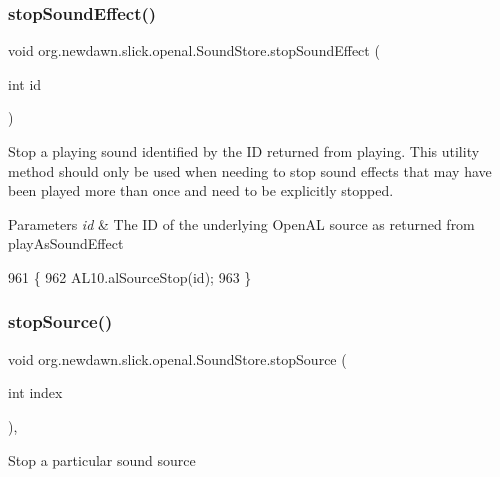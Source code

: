 \subsubsection{\texorpdfstring{stop\+Sound\+Effect()}{stopSoundEffect()}}
{\footnotesize\ttfamily void org.\+newdawn.\+slick.\+openal.\+Sound\+Store.\+stop\+Sound\+Effect (\begin{DoxyParamCaption}\item[{int}]{id }\end{DoxyParamCaption})\hspace{0.3cm}{\ttfamily [inline]}}

Stop a playing sound identified by the ID returned from playing. This utility method should only be used when needing to stop sound effects that may have been played more than once and need to be explicitly stopped.


\begin{DoxyParams}{Parameters}
{\em id} & The ID of the underlying Open\+AL source as returned from play\+As\+Sound\+Effect \\
\hline
\end{DoxyParams}

\begin{DoxyCode}
961                                         \{
962         AL10.alSourceStop(\textcolor{keywordtype}{id});
963     \}
\end{DoxyCode}
\mbox{\label{classorg_1_1newdawn_1_1slick_1_1openal_1_1_sound_store_abbc79b5bafc0b1e6108e028e8232f572}} 
\subsubsection{\texorpdfstring{stop\+Source()}{stopSource()}}
{\footnotesize\ttfamily void org.\+newdawn.\+slick.\+openal.\+Sound\+Store.\+stop\+Source (\begin{DoxyParamCaption}\item[{int}]{index }\end{DoxyParamCaption})\hspace{0.3cm}{\ttfamily [inline]}, {\ttfamily [package]}}

Stop a particular sound source


